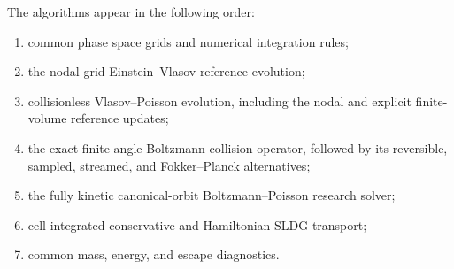\documentclass[11pt]{article}
\newif\ifvenusfullcpu
\begin{document}
\ifvenusfullcpu
The algorithms appear in the following order:
\begin{enumerate}
\item common phase space grids and numerical integration rules;
\item the nodal grid Einstein--Vlasov reference evolution;
\item collisionless Vlasov--Poisson evolution, including the nodal and
      explicit finite-volume reference updates;
\item the exact finite-angle Boltzmann collision operator, followed by its
      reversible, sampled, streamed, and Fokker--Planck alternatives;
\item the fully kinetic canonical-orbit Boltzmann--Poisson research solver;
\item cell-integrated conservative and Hamiltonian SLDG transport;
\item common mass, energy, and escape diagnostics.
\end{enumerate}
\end{document}
